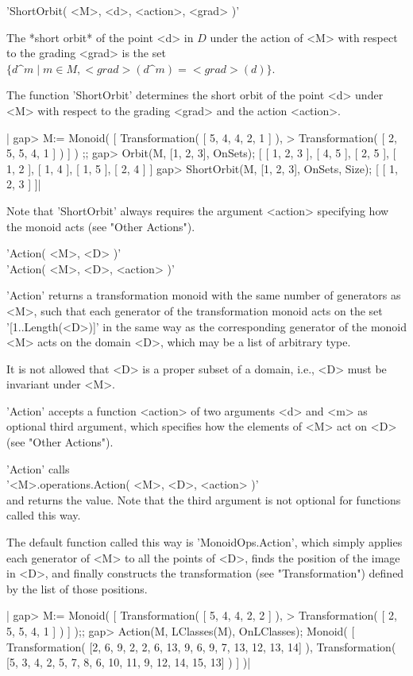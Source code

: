 'ShortOrbit( <M>, <d>, <action>, <grad> )'

The *short orbit* of  the point <d> in $D$  under the action of  <M> with
respect  to  the grading   <grad> is  the   set  $\{d\^m  \mid m   \in M,
<grad>(d\^m) = <grad>(d)\}$.

The function 'ShortOrbit' determines  the short  orbit  of the  point <d>
under <M> with respect to the grading <grad> and the action <action>.

|   gap> M:= Monoid( [ Transformation( [ 5, 4, 4, 2, 1 ] ), 
   > Transformation( [ 2, 5, 5, 4, 1 ] ) ] ) ;;
   gap> Orbit(M, [1, 2, 3], OnSets); 
   [ [ 1, 2, 3 ], [ 4, 5 ], [ 2, 5 ], [ 1, 2 ], [ 1, 4 ], [ 1, 5 ], 
     [ 2, 4 ] ]
   gap> ShortOrbit(M, [1, 2, 3], OnSets, Size);
   [ [ 1, 2, 3 ] ]|

Note that 'ShortOrbit'  always requires the  argument <action> specifying
how the monoid acts (see "Other Actions").


'Action( <M>, <D> )'\\
'Action( <M>, <D>, <action> )'

'Action'   returns  a  transformation   monoid with  the  same  number of
generators as <M>, such that  each generator of the transformation monoid
acts on the set '[1..Length(<D>)]'  in the same  way as the corresponding
generator of the monoid <M> acts on the  domain <D>, which  may be a list
of arbitrary type.

It is not allowed that <D> is a proper subset of a domain, i.e., <D> must
be invariant under <M>.

'Action' accepts a  function  <action> of two  arguments  <d> and  <m> as
optional third argument, which specifies  how the elements  of <M> act on
<D> (see "Other Actions").

'Action' calls \\
'<M>.operations.Action( <M>, <D>, <action> )' \\
and returns the value.  Note that the  third argument is not optional for
functions called this way.

The default function called this  way is 'MonoidOps.Action', which simply
applies   each generator of  <M>  to all  the  points of   <D>, finds the
position of the image in  <D>, and finally constructs the  transformation
(see "Transformation") defined by the list of those positions.

|    gap> M:= Monoid( [ Transformation( [ 5, 4, 4, 2, 2 ] ), 
    > Transformation( [ 2, 5, 5, 4, 1 ] ) ] );;
    gap> Action(M, LClasses(M), OnLClasses);
    Monoid( [
    Transformation( [2, 6, 9, 2, 2, 6, 13, 9, 6, 9, 7, 13, 12, 13, 14] ), 
    Transformation( [5, 3, 4, 2, 5, 7, 8, 6, 10, 11, 9, 12, 14, 15, 13] )
    ] )|


